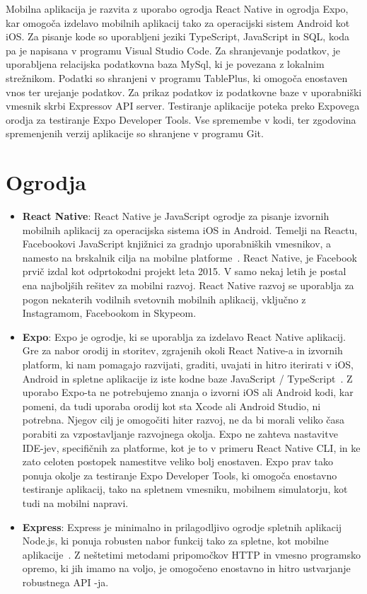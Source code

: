 \documentclass[a4paper, 12pt]{book}
\begin{document}
Mobilna aplikacija je razvita z uporabo ogrodja React Native in ogrodja Expo, kar omogoča izdelavo mobilnih aplikacij tako za operacijski sistem Android kot iOS. Za pisanje kode so uporabljeni jeziki TypeScript, JavaScript in SQL, koda pa je napisana v programu Visual Studio Code. Za shranjevanje podatkov, je uporabljena relacijska podatkovna baza MySql, ki je povezana z lokalnim strežnikom. Podatki so shranjeni v programu TablePlus, ki omogoča enostaven vnos ter urejanje podatkov. Za prikaz podatkov iz podatkovne baze v uporabniški vmesnik skrbi Expressov API server.
Testiranje aplikacije poteka preko Expovega orodja za testiranje Expo Developer Tools. Vse spremembe v kodi, ter zgodovina spremenjenih verzij aplikacije so shranjene v programu Git.

\section{Ogrodja}
 \begin{itemize}
  \item \textbf{React Native}: React Native je JavaScript ogrodje za pisanje izvornih mobilnih aplikacij za operacijska sistema iOS in Android. Temelji na Reactu, Facebookovi JavaScript knjižnici za gradnjo uporabniških vmesnikov, a namesto na brskalnik cilja na mobilne platforme~\cite{RN}. 
React Native, je Facebook prvič izdal kot odprtokodni projekt leta 2015. V samo nekaj letih je postal ena najboljših rešitev za mobilni razvoj. React Native razvoj se uporablja za pogon nekaterih vodilnih svetovnih mobilnih aplikacij, vključno z Instagramom, Facebookom in Skypeom.
  
  \item \textbf{Expo}: Expo je ogrodje, ki se uporablja za izdelavo React Native aplikacij. Gre za nabor orodij in storitev, zgrajenih okoli React Native-a in izvornih platform, ki nam pomagajo razvijati, graditi, uvajati in hitro iterirati v iOS, Android in spletne aplikacije iz iste kodne baze JavaScript / TypeScript~\cite{EXPO}. Z uporabo Expo-ta ne potrebujemo znanja o izvorni iOS ali Android kodi, kar pomeni, da tudi uporaba orodij kot sta Xcode ali Android Studio, ni potrebna. Njegov cilj je omogočiti hiter razvoj, ne da bi morali veliko časa porabiti za vzpostavljanje razvojnega okolja. Expo ne zahteva nastavitve IDE-jev, specifičnih za platforme, kot je to v primeru React Native CLI, in ke zato celoten postopek namestitve veliko bolj enostaven. Expo prav tako ponuja okolje za testiranje Expo Developer Tools, ki omogoča enostavno testiranje aplikacij, tako na spletnem vmesniku, mobilnem simulatorju, kot tudi na mobilni napravi.
  
\item \textbf{Express}: Express je minimalno in prilagodljivo ogrodje spletnih aplikacij Node.js, ki ponuja robusten nabor funkcij tako za spletne, kot mobilne aplikacije~\cite{Express}. Z neštetimi metodami pripomočkov HTTP in vmesno programsko opremo, ki jih imamo na voljo, je omogočeno enostavno in hitro ustvarjanje robustnega API -ja.
\end{itemize}
\end{document}
